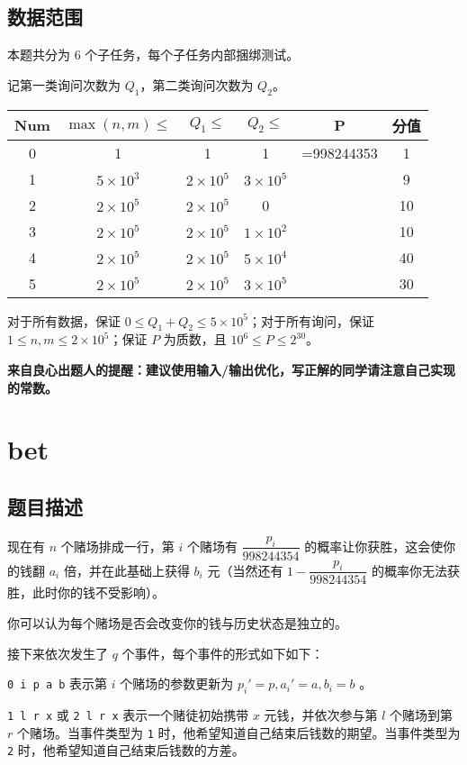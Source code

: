 \documentclass[UTF8]{article}
\begin{document}
\subsection{数据范围}

本题共分为 $6$ 个子任务，每个子任务内部捆绑测试。

记第一类询问次数为 $Q_1$，第二类询问次数为 $Q_2$。

\begin{tabular}
{|c|c|c|c|c|c|}
	\hline
	Num & $\max(n,m) \leq$ & $Q_1 \leq$ & $Q_2 \leq$ & P & 分值\\
	\hline
	0 & 1 & 1 & 1  & =998244353 & 1\\
	\hline
	1 & $5\times 10^3$ & $2\times10^5$ & $3\times10^5$  &  & 9\\
	\hline
	2 & $2\times 10^5$ & $2\times 10^5$ & 0 &  & 10\\
	\hline
	3 & $2\times 10^5$ & $2\times 10^5$ & $1\times 10^2$ &  & 10\\
	\hline
	4 & $2\times 10^5$ & $2\times 10^5$ & $5\times 10^4$ &  & 40\\
	\hline
	5 & $2\times 10^5$ & $2\times 10^5$ & $3\times 10^5$ &  & 30\\
	\hline
\end{tabular}

对于所有数据，保证 $0\leq Q_1+Q_2 \leq 5\times 10^5$；对于所有询问，保证 $1\leq n,m\leq 2\times 10^5$；保证 $P$ 为质数，且 $10^6 \leq P \leq 2^{30}$。

\textbf{来自良心出题人的提醒：建议使用输入/输出优化，写正解的同学请注意自己实现的常数。}
\newpage
\section{bet}
\subsection{题目描述}

现在有 $n$ 个赌场排成一行，第 $i$ 个赌场有 $\dfrac{p_i}{998244354}$ 的概率让你获胜，这会使你的钱翻 $a_i$ 倍，并在此基础上获得 $b_i$ 元（当然还有 $1-\dfrac{p_i}{998244354}$ 的概率你无法获胜，此时你的钱不受影响）。

你可以认为每个赌场是否会改变你的钱与历史状态是独立的。

接下来依次发生了 $q$ 个事件，每个事件的形式如下如下：

\texttt{0 i p a b} 表示第 $i$ 个赌场的参数更新为 $p_i'=p,a_i'=a,b_i=b$ 。

\texttt{1 l r x} 或 \texttt{2 l r x} 表示一个赌徒初始携带 $x$ 元钱，并依次参与第 $l$ 个赌场到第 $r$ 个赌场。当事件类型为 \texttt{1} 时，他希望知道自己结束后钱数的期望。当事件类型为 \texttt{2} 时，他希望知道自己结束后钱数的方差。
\end{document}
